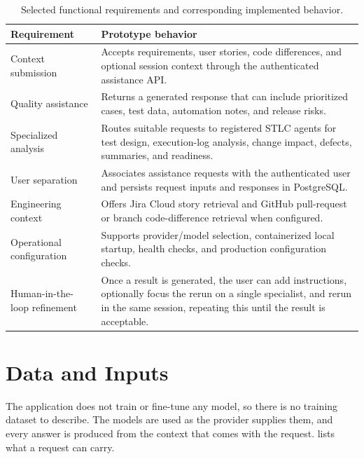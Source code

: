 \begin{table}[htbp]
\centering
\small
\begin{tabularx}{\textwidth}{p{}X}
\toprule
\textbf{Requirement} & \textbf{Prototype behavior} \\
\midrule
Context submission & Accepts requirements, user stories, code differences, and optional session context through the authenticated assistance API. \\
Quality assistance & Returns a generated response that can include prioritized cases, test data, automation notes, and release risks. \\
Specialized analysis & Routes suitable requests to registered STLC agents for test design, execution-log analysis, change impact, defects, summaries, and readiness. \\
User separation & Associates assistance requests with the authenticated user and persists request inputs and responses in PostgreSQL. \\
Engineering context & Offers Jira Cloud story retrieval and GitHub pull-request or branch code-difference retrieval when configured. \\
Operational configuration & Supports provider/model selection, containerized local startup, health checks, and production configuration checks. \\
Human-in-the-loop refinement & Once a result is generated, the user can add instructions, optionally focus the rerun on a single specialist, and rerun in the same session, repeating this until the result is acceptable. \\
\bottomrule
\end{tabularx}
\caption{Selected functional requirements and corresponding implemented behavior.}
\label{tab:functional-requirements}
\end{table}

\section{Data and Inputs}
The application does not train or fine-tune any model, so there is no training dataset to describe. The models are used as the provider supplies them, and every answer is produced from the context that comes with the request.  lists what a request can carry.

